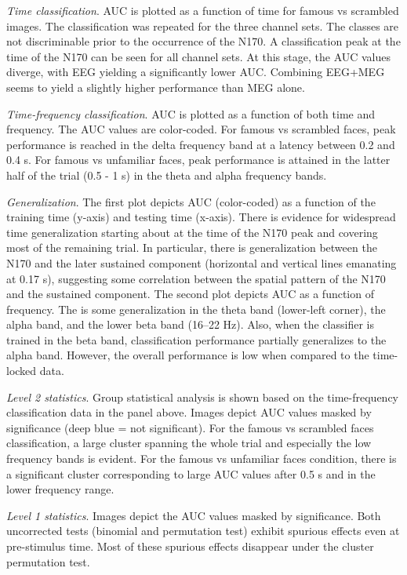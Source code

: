 \documentclass[utf8]{frontiersSCNS} %
\begin{document}
\textit{Time classification}. AUC is plotted as a function of time for famous vs scrambled images. The classification was repeated for the three channel sets. The classes are not discriminable prior to the occurrence of the N170. A classification peak at the time of the N170 can be seen for all channel sets. At this stage, the AUC values diverge, with EEG yielding a significantly lower AUC. Combining EEG+MEG seems to yield a slightly higher performance than MEG alone.

\textit{Time-frequency classification}. AUC is plotted as a function of both time and frequency. The AUC values are color-coded. For famous vs scrambled faces, peak performance is reached in the delta frequency band at a latency between 0.2 and 0.4 s. For famous vs unfamiliar faces, peak performance is attained in the latter half of the trial (0.5 - 1 s) in the theta and alpha frequency bands.

\textit{Generalization}. The first plot depicts AUC (color-coded) as a function of the training time (y-axis) and testing time (x-axis). There is evidence for widespread time generalization starting about at the time of the N170 peak and covering most of the remaining trial. In particular, there is generalization between the N170 and the later sustained component (horizontal and vertical lines emanating at 0.17 s), suggesting some correlation between the spatial pattern of the N170 and the sustained component.
The second plot depicts AUC as a function of frequency. The is some generalization in the theta band (lower-left corner), the alpha band, and the lower beta band (16--22 Hz). Also, when the classifier is trained in the beta band, classification performance partially generalizes to the alpha band. However, the overall performance is low when compared to the time-locked data.

\textit{Level 2 statistics}. Group statistical analysis is shown based on the time-frequency classification data in the panel above. Images depict AUC values masked by significance (deep blue = not significant). For the famous vs scrambled faces classification, a large cluster spanning the whole trial and especially the low frequency bands is evident. For the famous vs unfamiliar faces condition, there is a significant  cluster corresponding to large AUC values after 0.5 s and in the lower frequency range.

\textit{Level 1 statistics}. Images depict the AUC values masked by significance. Both uncorrected tests (binomial and permutation test) exhibit spurious effects even at pre-stimulus time. Most of these spurious effects disappear under the cluster permutation test.
\end{document}
